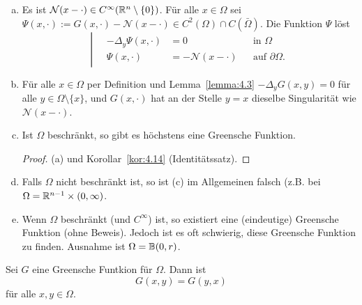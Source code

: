 \begin{bem}
  \label{bem:5.3}
  \begin{enumerate}[(a)]
  \item \label{bem:5.3-1} Es ist $\mathcal{N}(x-\cdot)\in C^\infty(\mathbb{R}^n\setminus\{0\})$. Für alle $x\in\Omega$ sei $\Psi(x,\cdot):=G(x,\cdot)-\mathcal{N}(x-\cdot)\in C^2(\Omega)\cap C(\bar\Omega)$. Die Funktion $\Psi$ löst
    \[
    \left\lvert\quad
    \begin{split}
      -\Delta_y\Psi(x,\cdot)&=0&&\text{in }\Omega \\
      \Psi(x,\cdot)&=-\mathcal{N}(x-\cdot) && \text{auf } \partial\Omega.
    \end{split}
    \right.
    \]
  \item \label{bem:5.3-2} Für alle $x\in\Omega$ per Definition und Lemma~\ref{lemma:4.3} $-\Delta_yG(x,y)=0$ für alle $y\in\Omega\setminus\{x\}$, und $G(x,\cdot)$ hat an der Stelle $y=x$ dieselbe Singularität wie $\mathcal{N}(x-\cdot)$.
  \item  \label{bem:5.3-3} Ist $\Omega$ beschränkt, so gibt es höchstens eine Greensche Funktion.
    \begin{proof}
      (a) und Korollar~\ref{kor:4.14} (Identitätssatz).
    \end{proof}
  \item \label{bem:5.3-4} Falls $\Omega$ nicht beschränkt ist, so ist (c) im Allgemeinen falsch (z.B. bei $\Omega=\mathbb{R}^{n-1}\times(0,\infty)$.
  \item \label{bem:5.3-5} Wenn $\Omega$ beschränkt (und $C^\infty$) ist, so existiert eine (eindeutige) Greensche Funktion (ohne Beweis). Jedoch ist es oft schwierig, diese Greensche Funktion zu finden. Ausnahme ist $\Omega=\mathbb{B}(0,r)$.
  \end{enumerate}
\end{bem}

\begin{satz}[Symmetrie]
  \label{satz:5.4}
  Sei $G$ eine Greensche Funtkion für $\Omega$. Dann ist
  \[ G(x,y)=G(y,x) \]
  für alle $x,y\in\Omega$.
\end{satz}

